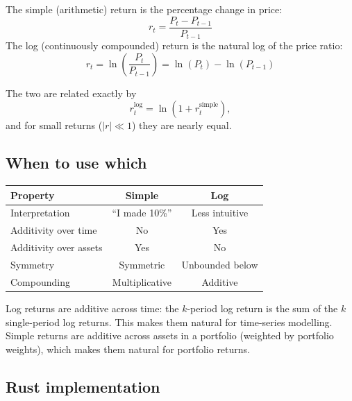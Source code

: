 
The simple (arithmetic) return is the percentage change in price:
\[
r_t = \frac{P_t - P_{t-1}}{P_{t-1}}
\]
The log (continuously compounded) return is the natural log of the price ratio:
\[
r_t = \ln\!\left(\frac{P_t}{P_{t-1}}\right) = \ln(P_t) - \ln(P_{t-1})
\]

The two are related exactly by
\[
r^{\text{log}}_t = \ln\!\left(1 + r^{\text{simple}}_t\right),
\]
and for small returns ($|r| \ll 1$) they are nearly equal.

\subsection{When to use which}

\begin{center}
\begin{tabular}{lcc}
\toprule
\textbf{Property} & \textbf{Simple} & \textbf{Log} \\
\midrule
Interpretation & ``I made 10\%'' & Less intuitive \\
Additivity over time & No & Yes \\
Additivity over assets & Yes & No \\
Symmetry & Symmetric & Unbounded below \\
Compounding & Multiplicative & Additive \\
\bottomrule
\end{tabular}
\end{center}

\begin{keyinsight}
Log returns are additive across time: the $k$-period log return is the sum of
the $k$ single-period log returns. This makes them natural for time-series
modelling. Simple returns are additive across assets in a portfolio (weighted
by portfolio weights), which makes them natural for portfolio returns.
\end{keyinsight}

\subsection{Rust implementation}

